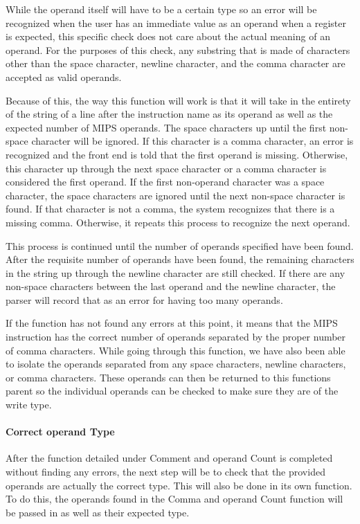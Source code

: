 \documentclass[
    parskip=half,
    fontsize=12pt,
    titlepage=firstiscover,
    toc=bibliography,
    numbers=endperiod
]{scrartcl}
\begin{document}
While the operand itself will have to be a certain type so an error will
be recognized when the user has an immediate value as an operand when a
register is expected, this specific check does not care about the actual
meaning of an operand. For the purposes of this check, any substring
that is made of characters other than the space character, newline
character, and the comma character are accepted as valid operands.

Because of this, the way this function will work is that it will take in
the entirety of the string of a line after the instruction name as its
operand as well as the expected number of MIPS operands. The space
characters up until the first non-space character will be ignored. If
this character is a comma character, an error is recognized and the
front end is told that the first operand is missing. Otherwise, this
character up through the next space character or a comma character is
considered the first operand. If the first non-operand character was a
space character, the space characters are ignored until the next
non-space character is found. If that character is not a comma, the
system recognizes that there is a missing comma. Otherwise, it repeats
this process to recognize the next operand.

This process is continued until the number of operands specified have
been found. After the requisite number of operands have been found, the
remaining characters in the string up through the newline character are
still checked. If there are any non-space characters between the last
operand and the newline character, the parser will record that as an
error for having too many operands.

If the function has not found any errors at this point, it means that
the MIPS instruction has the correct number of operands separated by the
proper number of comma characters. While going through this function, we
have also been able to isolate the operands separated from any space
characters, newline characters, or comma characters. These operands can
then be returned to this function\textquotesingle s parent so the
individual operands can be checked to make sure they are of the write
type.

\paragraph{Correct operand Type}

After the function detailed under Comment and operand Count is completed
without finding any errors, the next step will be to check that the
provided operands are actually the correct type. This will also be done
in its own function. To do this, the operands found in the Comma and
operand Count function will be passed in as well as their expected type.
\end{document}
